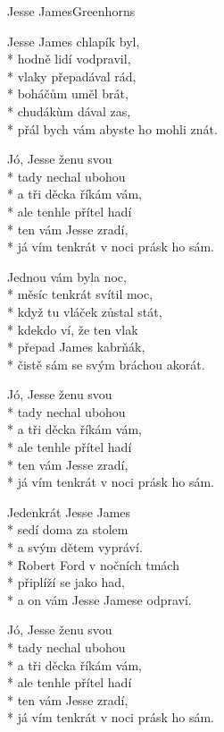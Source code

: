 \documentclass[10.5pt]{book}
\begin{document}
\begin{poem}{Jesse James}{Greenhorns}

\settowidth{\versewidth}{Běželi běželi bez uzdy a sedla}

Jesse James chlapík byl,\\*
hodně lidí vodpravil, \\*
vlaky přepadával rád,\\*
boháčům uměl brát,\\*
chudákùm dával zas,\\*
přál bych vám abyste ho mohli znát.

Jó, Jesse ženu svou\\*
tady nechal ubohou\\*
a tři děcka říkám vám,\\*
ale tenhle přítel hadí\\*
ten vám Jesse zradí,\\*
já vím tenkrát v noci prásk ho sám.

Jednou vám byla noc,\\*
měsíc tenkrát svítil moc,\\*
když tu vláček zůstal stát,\\*
kdekdo ví, že ten vlak\\*
přepad James kabrňák,\\*
čistě sám se svým bráchou akorát.

Jó, Jesse ženu svou\\*
tady nechal ubohou\\*
a tři děcka říkám vám,\\*
ale tenhle přítel hadí\\*
ten vám Jesse zradí,\\*
já vím tenkrát v noci prásk ho sám.

Jedenkrát Jesse James\\*
sedí doma za stolem\\*
a svým dětem vypráví.\\*
Robert Ford v nočních tmách\\*
připlíží se jako had,\\*
a on vám Jesse Jamese odpraví.

Jó, Jesse ženu svou\\*
tady nechal ubohou\\*
a tři děcka říkám vám,\\*
ale tenhle přítel hadí\\*
ten vám Jesse zradí,\\*
já vím tenkrát v noci prásk ho sám.

\end{poem}
\end{document}
